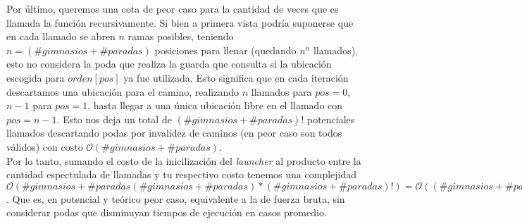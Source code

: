     Por último, queremos una cota de peor caso para la cantidad de veces que es llamada la función recursivamente. Si bien a primera vista podría suponerse que en cada llamado se abren $n$ ramas posibles, teniendo $n = (\#gimnasios + \#paradas)$ posiciones para llenar (quedando $n^n$ llamados), esto no considera la poda que realiza la guarda que consulta si la ubicación escogida para $orden[pos]$ ya fue utilizada. Esto significa que en cada iteración descartamos una ubicación para el camino, realizando $n$ llamados para $pos=0$, $n-1$ para $pos=1$, hasta llegar a una única ubicación libre en el llamado con $pos=n-1$. Esto nos deja un total de $(\#gimnasios + \#paradas)!$ potenciales llamados descartando podas por invalidez de caminos (en peor caso son todos válidos) con costo $\mathcal{O}(\#gimnasios + \#paradas)$.
    \\

    Por lo tanto, sumando el costo de la inicilización del \emph{launcher} al producto entre la cantidad espectulada de llamadas y tu respectivo costo tenemos una complejidad $\mathcal{O}(\#gimnasios + \#paradas (\#gimnasios + \#paradas)*(\#gimnasios + \#paradas)!) = \mathcal{O}((\#gimnasios + \#paradas)!)$. Que es, en potencial y teórico peor caso, equivalente a la de fuerza bruta, sin considerar podas que disminuyan tiempos de ejecución en casos promedio.
